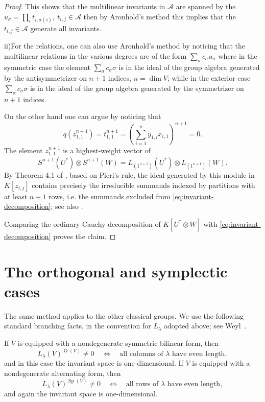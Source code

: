 \documentclass[10pt]{amsart}
\theoremstyle{definition}
\theoremstyle{remark}
\newcommand{\Sp}{\operatorname{Sp}}
\newcommand{\OO}{\operatorname{O}}
\begin{document}
\begin{proof}
This shows that the multilinear invariants  in $\mathcal A $  are spanned by the $u_\sigma=\prod_it_{i,\sigma(i)},\ t_{i,j}\in \mathcal A $ then by Aronhold's method this implies that the  $t_{i,j}\in \mathcal A $ generate all invariants.\medskip


ii)\quad For the relations, one can also use Aronhold's method  by noticing that the multilinear relations in the various degrees are of the form  $\sum_\sigma c_\sigma u_\sigma$ where in the symmetric case the element $\sum_\sigma c_\sigma  \sigma$ is in the ideal of the group algebra generated by the antisymmetrizer on $n+1$  indices, $n=\dim V$; while in the exterior case  $\sum_\sigma c_\sigma  \sigma$ is in the ideal of the group algebra generated by the  symmetrizer on $n+1$  indices.\medskip

On the other hand  one can argue by noticing that
\[
q(z_{1,1}^{n+1})=t_{1,1}^{n+1}
 =\left(\sum_{i=1}^n y_{1,i}x_{i,1}\right)^{n+1}=0.
\]
The element $z_{1,1}^{n+1}$ is a highest-weight vector of
\[
S^{n+1}(U^*)\otimes S^{n+1}(W)
=L_{(1^{n+1})}(U^*)\otimes L_{(1^{n+1})}(W ).
\]
By Theorem 4.1 of \cite{DePE1980}, based on Pieri's rule, the ideal generated by this module in $K[z_{i,j}]$ contains precisely
the irreducible summands indexed by partitions with at least $n+1$
rows, i.e. the summands excluded from
\eqref{eq:invariant-decomposition}; see also
\cite[Chapter~5]{Fulton}.  \smallskip


Comparing the ordinary Cauchy decomposition
of $K[U^*\otimes W ]$ with \eqref{eq:invariant-decomposition} proves the
claim.
\end{proof}

 
\section{The orthogonal and symplectic cases}
\label{sec:char-zero-orth-symp}

The same method applies to the other classical groups.  We use the
following standard branching facts, in the convention for $L_\lambda$
adopted above; see Weyl~\cite[Chapters~VI--VII]{Weyl}.

If $V$ is equipped with a nondegenerate symmetric bilinear form, then
\begin{equation}\label{InvOrt}
L_\lambda(V)^{\OO(V)}\ne0
\quad\Longleftrightarrow\quad
\text{all columns of $\lambda$ have even length},
\end{equation}
and in this case the invariant space is one-dimensional.  If $V$ is
equipped with a nondegenerate alternating form, then
\begin{equation}\label{InvSym}
L_\lambda(V)^{\Sp(V)}\ne0
\quad\Longleftrightarrow\quad
\text{all rows of $\lambda$ have even length},
\end{equation}
and again the invariant space is one-dimensional.
\end{document}
